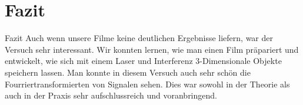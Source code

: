 \chapter{Fazit}
Fazit
Auch wenn unsere Filme keine deutlichen Ergebnisse liefern, war der Versuch sehr interessant. 
Wir konnten lernen, wie man einen Film präpariert und entwickelt, wie sich mit einem Laser und Interferenz 3-Dimensionale Objekte speichern lassen.
Man konnte in diesem Versuch auch sehr schön die Fourriertransformierten von Signalen sehen. 
Dies war sowohl in der Theorie als auch in der Praxis sehr aufschlussreich und voranbringend.
